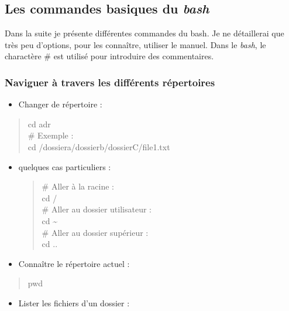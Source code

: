 \subsection{\texorpdfstring{Les commandes basiques du
\emph{bash}}{Les commandes basiques du bash}}\label{les-commandes-basiques-du-bash}

Dans la suite je présente différentes commandes du bash. Je ne
détaillerai que très peu d'options, pour les connaître, utiliser le
manuel. Dans le \emph{bash}, le charactère \# est utilisé pour
introduire des commentaires.

\subsubsection{Naviguer à travers les différents
répertoires}\label{naviguer-uxe0-travers-les-diffuxe9rents-ruxe9pertoires}

\begin{itemize}
\tightlist
\item
  Changer de répertoire :
\end{itemize}

\begin{quote}
cd adr\\
\# Exemple :\\
cd /dossiera/dossierb/dossierC/file1.txt
\end{quote}

\begin{itemize}
\item
  quelques cas particuliers :

  \begin{quote}
  \# Aller à la racine :\\
  cd /\\
  \# Aller au dossier utilisateur :\\
  cd \textasciitilde{}\\
  \# Aller au dossier supérieur :\\
  cd ..
  \end{quote}
\item
  Connaître le répertoire actuel :
\end{itemize}

\begin{quote}
pwd
\end{quote}

\begin{itemize}
\tightlist
\item
  Lister les fichiers d'un dossier :
\end{itemize}

